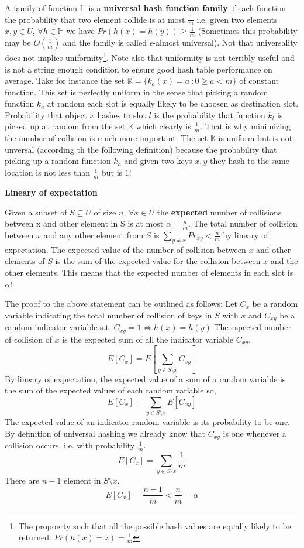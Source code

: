 A family of function $\mathbb{H}$ is a  \textbf{universal hash function family} if each function the probability that two element collide is at most $\frac{1}{m}$ i.e. given two elements $x,y \in U$, $\forall h \in \mathbb{H}$ we have $Pr(h(x) = h(y)) \geq \frac{1}{m}$ (Sometimes this probability may be $O(\frac{1}{m})$ and the family is called $\epsilon$-almost universal). Not that universality does not implies uniformity\footnote{The propoerty such that all the possible hash values are equally likely to be returned. $Pr(h(x)=z) = \frac{1}{m}$}. Note also that uniformity is not terribly useful and is not a string enough condition to ensure good hash table performance on average. Take for instance the set $\mathbb{K} = \{ k_a(x) = a \: : 0\geq a<m\}$ of  constant function. This set is perfectly uniform in the sense that picking a random function $k_a$ at random each slot is equally likely to be choosen as destination slot. Probability that object $x$ hashes to slot $l$ is the probability that function $k_l$ is picked up at random from the set $\mathbb{K}$ which clearly is $\frac{1}{m}$. That is why minimizing the number of collision is much more important. The set $\mathbb{K}$ is uniform but is not unversal (according th the following definition) because the probability that picking up a random function $k_a$ and given two keys $x,y$ they hash to the same location is not less than $\frac{1}{m}$ but is $1$!


\begin{framed}
\textbf{Lineary of expectation} \hfill \\

\end{framed}
Given a subset of $S \subseteq U$ of size $n$, $\forall x \in U$ the \textbf{expected} number of collisions between x and other element in S is at most $\alpha = \frac{n}{m}$. The total number of collision between $x$ and any other element from $S$ is $\sum_{y\neq x} Pr_{xy} < \frac{n}{m}$ by lineary of expectation. The expected value of the number of collision between $x$ and other elements of $S$ is the sum of the expected value for the collision between $x$ and the other elements.  This means that the expected number of elements in each slot is $\alpha$!

The proof to the above statement can be outlined as follows:
Let $C_x$ be a random variable indicating the total number of collision of keys in $S$ with $x$ and $C_{xy}$ be a random indicator variable  s.t. $C_{xy}=1 \Longleftrightarrow h(x)=h(y)$
The espected number of collision of $x$ is the expected sum of all the indicator variable $C_{xy}$.
\[
E[C_x] = E[\sum_{y\in S \setminus x} C_{xy}]
\]
By lineary of expectation, the expected value of a sum of a random variable is the sum of the expected values of each random variable so,
\[
E[C_x] = \sum_{y\in S \setminus x} E[C_{xy}]
\]
The expected value of an indicator random variable is its probability to be one. By definition of universal hashing we already know that $C_{xy}$ is one whenever a collision occurs, i.e. with probability $\frac{1}{m}$. 
\[
E[C_x] = \sum_{y\in S \setminus x} \frac{1}{m}
\]
There are $n-1$ element in $S \setminus x$,
\[
E[C_x] = \frac{n-1}{m} < \frac{n}{m}=\alpha
\]